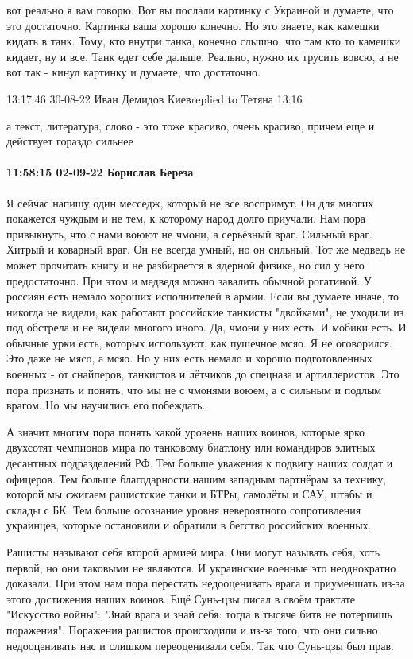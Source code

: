 вот реально я вам говорю. Вот вы послали картинку с Украиной и думаете, что это
достаточно. Картинка ваша хорошо конечно. Но это знаете, как камешки кидать в
танк. Тому, кто внутри танка, конечно слышно, что там кто то камешки кидает, ну
и все. Танк едет себе дальше. Реально, нужно их трусить вовсю, а не вот так -
кинул картинку и думаете, что достаточно.


13:17:46 30-08-22
Иван Демидов Киевreplied to Тетяна
13:16

а текст, литература, слово - это тоже красиво, очень красиво, причем еще и
действует гораздо сильнее


\paragraph{11:58:15 02-09-22 Борислав Береза}

Я сейчас напишу один месседж, который не все воспримут. Он для многих покажется
чуждым и не тем, к которому народ долго приучали. Нам пора привыкнуть, что с
нами воюют не чмони, а серьёзный враг. Сильный враг. Хитрый и коварный враг. Он
не всегда умный, но он сильный. Тот же медведь не может прочитать книгу и не
разбирается в ядерной физике, но сил у него предостаточно. При этом и медведя
можно завалить обычной рогатиной. У россиян есть немало хороших исполнителей в
армии. Если вы думаете иначе, то никогда не видели, как работают российские
танкисты "двойками", не уходили из под обстрела и не видели многого иного. Да,
чмони у них есть. И мобики есть. И обычные урки есть, которых используют, как
пушечное мсяо. Я не оговорился. Это даже не мясо, а мсяо. Но у них есть немало
и хорошо подготовленных военных - от снайперов, танкистов и лётчиков до
спецназа и артиллеристов. Это пора признать и понять, что мы не с чмонями
воюем, а с сильным и подлым врагом. Но мы научились его побеждать.

А значит многим пора понять какой уровень наших воинов, которые ярко двухсотят
чемпионов мира по танковому биатлону или командиров элитных десантных
подразделений РФ. Тем больше уважения к подвигу наших солдат и офицеров. Тем
больше благодарности нашим западным партнёрам за технику, которой мы сжигаем
рашистские танки и БТРы, самолёты и САУ, штабы и склады с БК. Тем больше
осознание уровня невероятного сопротивления украинцев, которые остановили и
обратили в бегство российских военных. 

Рашисты называют себя второй армией мира. Они могут называть себя, хоть первой,
но они таковыми не являются. И украинские военные это неоднократно доказали.
При этом нам пора перестать недооценивать врага и приуменшать из-за этого
достижения наших воинов. Ещё Сунь-цзы писал в своём трактате "Искусство войны":
"Знай врага и знай себя: тогда в тысяче битв не потерпишь поражения". Поражения
рашистов происходили и из-за того, что они сильно недооценивать нас и слишком
переоценивали себя. Так что Сунь-цзы был прав. 

